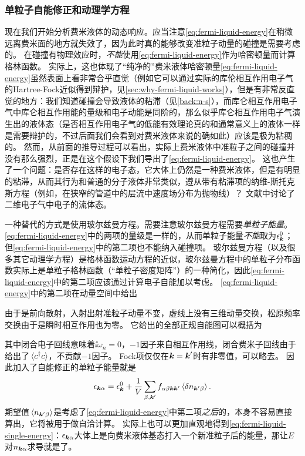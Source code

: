 \subsubsection{单粒子自能修正和动理学方程}

现在我们开始分析费米液体的动态响应。应当注意\eqref{eq:fermi-liquid-energy}在稍微远离费米面的地方就失效了，因为此时真的能够改变准粒子动量的碰撞是需要考虑的。
在碰撞有物理效应时，\emph{不能}使用\eqref{eq:fermi-liquid-energy}作为哈密顿量而计算格林函数。
实际上，这也体现了“纯净的”费米液体哈密顿量\eqref{eq:fermi-liquid-energy}虽然表面上看非常合乎直觉（例如它可以通过实际的库伦相互作用电子气的Hartree-Fock近似得到辩护，见\autoref{sec:why-fermi-liquid-works}），但是有非常反直觉的地方：我们知道碰撞会导致液体的粘滞（见\autoref{back:n-s}），而库仑相互作用电子气中库仑相互作用能的量级和电子动能是同阶的，那么似乎库仑相互作用电子气演生出的液体态（是否相互作用电子气的低能有效理论真的和通常意义上的液体一样是需要辩护的，不过后面我们会看到对费米液体来说的确如此）应该是极为粘稠的。
然而，从前面的推导过程可以看出，实际上费米液体中准粒子之间的碰撞并没有那么强烈，正是在这个假设下我们导出了\eqref{eq:fermi-liquid-energy}。
这也产生了一个问题：是否存在这样的电子态，它大体上仍然是一种费米液体，但是有明显的粘滞，从而其行为和普通的分子液体非常类似，遵从带有粘滞项的纳维-斯托克斯方程（例如，在狭窄的管道中的层流中速度场分布为抛物线）？
文献\cite{Chandra_2019}中讨论了二维电子气中电子的流体态。

一种替代的方式是使用玻尔兹曼方程。需要注意玻尔兹曼方程需要\emph{单粒子能量}。\eqref{eq:fermi-liquid-energy}中的两项的量级是一样的，从而单粒子能量\emph{不能}取为$\epsilon_{\vb*{k}}^0$；但\eqref{eq:fermi-liquid-energy}中的第二项也不能纳入碰撞项。
玻尔兹曼方程（以及很多其它动理学方程）是格林函数运动方程的近似，玻尔兹曼方程中的单粒子分布函数实际上是单粒子格林函数（“单粒子密度矩阵”）的一种简化，因此\eqref{eq:fermi-liquid-energy}中的第二项应该通过计算电子自能加以考虑。
\eqref{eq:fermi-liquid-energy}中的第二项在动量空间中给出

由于是前向散射，入射出射准粒子动量不变，虚线上没有三维动量交换，松原频率交换由于是瞬时相互作用也为零。
它给出的全部正规自能图可以概括为

其中闭合电子回线意味着$\ii \omega_n = 0$，$-1$因子来自相互作用线，闭合费米子回线由于给出了$\expval*{c^\dagger c}$，不贡献$-1$因子。
Fock项仅仅在$\vb*{k} = \vb*{k}'$时有非零值，可以略去。
因此加入了自能修正的单粒子能量就是
\begin{equation}
    \epsilon_{\vb*{k} \alpha} = \epsilon_{\vb*{k}}^0 + \frac{1}{V} \sum_{\beta, \vb*{k}'} f_{\alpha \beta \vb*{k} \vb*{k}'} \expval*{\var{n_{\vb*{k}' \beta}}}.
    \label{eq:fermi-liquid-single-energy}
\end{equation}
期望值$\expval*{n_{\vb*{k}' \beta}}$是考虑了\eqref{eq:fermi-liquid-energy}中第二项\emph{之后}的，本身不容易直接算出，它将被用于做自洽计算。
实际上也可以更加直观地得到\eqref{eq:fermi-liquid-single-energy}：$\epsilon_{\vb*{k} \alpha}$大体上是向费米液体基态打入一个新准粒子后的能量，那让$E$对$n_{\vb*{k} \alpha}$求导就是了。

